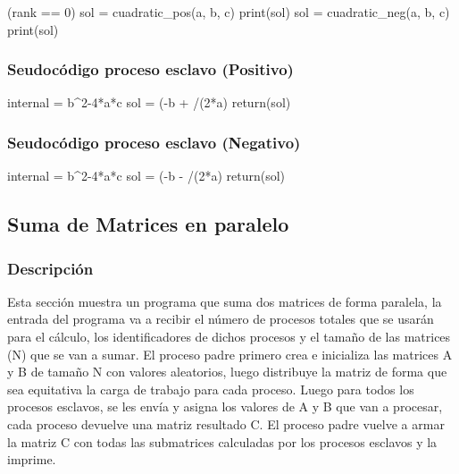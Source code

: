 \documentclass{article}
\begin{document}
\begin{program}
    \IF(rank == 0) 
    sol = cuadratic\_pos(a, b, c) 
    print(sol) 
    \ELSE {}
    sol = cuadratic\_neg(a, b, c) 
    print(sol) 
\end{program}

\subsubsection{Seudocódigo proceso esclavo (Positivo)}

\begin{program}
    internal = b^2-4*a*c 
    sol = (-b + /(2*a) 
    return(sol)
\end{program}

\subsubsection{Seudocódigo proceso esclavo (Negativo)}

\begin{program}
    internal = b^2-4*a*c 
    sol = (-b - /(2*a) 
    return(sol)
\end{program}

\subsection{Suma de Matrices en paralelo}

\subsubsection{Descripción}

Esta sección muestra un programa que suma dos matrices de forma paralela, la entrada del programa
va a recibir el número de procesos totales que se usarán para el cálculo, los identificadores
de dichos procesos y el tamaño de las matrices (N) que se van a sumar. El proceso padre primero crea e 
inicializa las matrices A y B de tamaño N con valores aleatorios, luego distribuye la matriz de forma
que sea equitativa la carga de trabajo para cada proceso. Luego para todos los procesos esclavos, se les
envía y asigna los valores de A y B que van a procesar, cada proceso devuelve una matriz resultado C. El proceso
padre vuelve a armar la matriz C con todas las submatrices calculadas por los procesos esclavos y la imprime.
\end{document}
